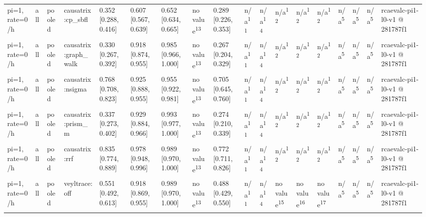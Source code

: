 \begin{table}[t]
\begin{tabular}{llllllllllllllllll}
pi=1, rate=0/h & all & pooled & causatrix:cp\_sbfl & 0.352 [0.288, 0.416] & 0.607 [0.567, 0.639] & 0.652 [0.634, 0.665] & no value\textsuperscript{13} & 0.289 [0.226, 0.353] & n/a\textsuperscript{11} & n/a\textsuperscript{14} & n/a\textsuperscript{12} & n/a\textsuperscript{12} & n/a\textsuperscript{12} & n/a\textsuperscript{5} & n/a\textsuperscript{5} & n/a\textsuperscript{5} & rcaevalc-pi1-l0-v1 @ 281787f1 \\
pi=1, rate=0/h & all & pooled & causatrix:graph\_walk & 0.330 [0.267, 0.392] & 0.918 [0.874, 0.955] & 0.985 [0.966, 1.000] & no value\textsuperscript{13} & 0.267 [0.204, 0.329] & n/a\textsuperscript{11} & n/a\textsuperscript{14} & n/a\textsuperscript{12} & n/a\textsuperscript{12} & n/a\textsuperscript{12} & n/a\textsuperscript{5} & n/a\textsuperscript{5} & n/a\textsuperscript{5} & rcaevalc-pi1-l0-v1 @ 281787f1 \\
pi=1, rate=0/h & all & pooled & causatrix:nsigma & 0.768 [0.708, 0.823] & 0.925 [0.888, 0.955] & 0.955 [0.922, 0.981] & no value\textsuperscript{13} & 0.705 [0.645, 0.760] & n/a\textsuperscript{11} & n/a\textsuperscript{14} & n/a\textsuperscript{12} & n/a\textsuperscript{12} & n/a\textsuperscript{12} & n/a\textsuperscript{5} & n/a\textsuperscript{5} & n/a\textsuperscript{5} & rcaevalc-pi1-l0-v1 @ 281787f1 \\
pi=1, rate=0/h & all & pooled & causatrix:prism\_m & 0.337 [0.273, 0.402] & 0.929 [0.884, 0.966] & 0.993 [0.977, 1.000] & no value\textsuperscript{13} & 0.274 [0.210, 0.339] & n/a\textsuperscript{11} & n/a\textsuperscript{14} & n/a\textsuperscript{12} & n/a\textsuperscript{12} & n/a\textsuperscript{12} & n/a\textsuperscript{5} & n/a\textsuperscript{5} & n/a\textsuperscript{5} & rcaevalc-pi1-l0-v1 @ 281787f1 \\
pi=1, rate=0/h & all & pooled & causatrix:rrf & 0.835 [0.774, 0.889] & 0.978 [0.948, 0.996] & 0.989 [0.970, 1.000] & no value\textsuperscript{13} & 0.772 [0.711, 0.826] & n/a\textsuperscript{11} & n/a\textsuperscript{14} & n/a\textsuperscript{12} & n/a\textsuperscript{12} & n/a\textsuperscript{12} & n/a\textsuperscript{5} & n/a\textsuperscript{5} & n/a\textsuperscript{5} & rcaevalc-pi1-l0-v1 @ 281787f1 \\
pi=1, rate=0/h & all & pooled & veyltrace:off & 0.551 [0.492, 0.613] & 0.918 [0.869, 0.955] & 0.989 [0.970, 1.000] & no value\textsuperscript{13} & 0.488 [0.429, 0.550] & n/a\textsuperscript{11} & n/a\textsuperscript{14} & no value\textsuperscript{15} & no value\textsuperscript{16} & no value\textsuperscript{17} & n/a\textsuperscript{5} & n/a\textsuperscript{5} & n/a\textsuperscript{5} & rcaevalc-pi1-l0-v1 @ 281787f1 \\

\end{tabular}
\end{table}
